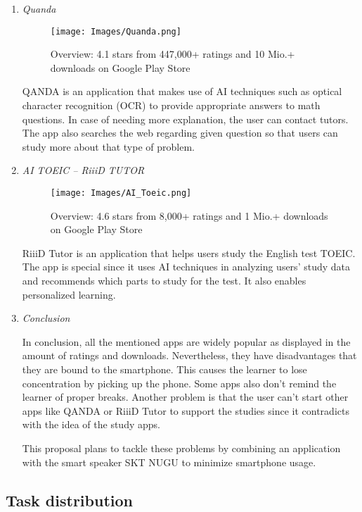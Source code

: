 \documentclass[conference]{IEEEtran}
\begin{document}
\begin{enumerate}
\item \textit{Quanda}

\begin{figure}[H]
    \centering
    \texttt{[image: Images/Quanda.png]}
    \caption{Overview: 4.1 stars from 447,000+ ratings and 10 Mio.+ downloads on Google Play Store}
\end{figure}

QANDA is an application that makes use of AI techniques such as optical character recognition (OCR) to provide appropriate answers to math questions. In case of needing more explanation, the user can contact tutors. The app also searches the web regarding given question so that users can study more about that type of problem.\\

\item \textit{AI TOEIC – RiiiD TUTOR}

\begin{figure}[H]
    \centering
    \texttt{[image: Images/AI\_Toeic.png]}
    \caption{Overview: 4.6 stars from 8,000+ ratings and 1 Mio.+ downloads on Google Play Store}
\end{figure}

RiiiD Tutor is an application that helps users study the English test TOEIC. The app is special since it uses AI techniques in analyzing users’ study data and recommends which parts to study for the test. It also enables personalized learning.\\

\item \textit{Conclusion}

In conclusion, all the mentioned apps are widely popular as displayed in the amount of ratings and downloads. Nevertheless, they have disadvantages that they are bound to the smartphone. This causes the learner to lose concentration by picking up the phone. Some apps also don't remind the learner of proper breaks. Another problem is that the user can't start other apps like QANDA or RiiiD Tutor to support the studies since it contradicts with the idea of the study apps.

This proposal plans to tackle these problems by combining an application with the smart speaker SKT NUGU to minimize smartphone usage.


\end{enumerate}


\subsection{Task distribution}
\end{document}
